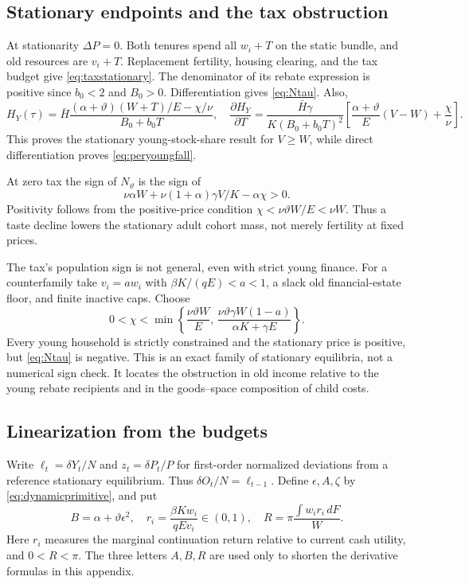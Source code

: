 \documentclass[11pt]{article}
\newcommand{\dd}{\,d}
\newcommand{\HH}{\bar H}
\newcommand{\tht}{\vartheta}
\begin{document}
\subsection{Stationary endpoints and the tax obstruction}
At stationarity $\Delta P=0$. Both tenures spend all $w_i+T$ on the static bundle, and old resources are $v_i+T$. Replacement fertility, housing clearing, and the tax budget give \eqref{eq:taxstationary}. The denominator of its rebate expression is positive since $b_0<2$ and $B_0>0$. Differentiation gives \eqref{eq:Ntau}. Also,
\begin{equation}
 H_Y(\tau)=\HH\frac{(\alpha+\tht)(W+T)/E-\chi/\nu}{B_0+b_0T},\quad
 \frac{\partial H_Y}{\partial T}
 =\frac{\HH\gamma}{K(B_0+b_0T)^2}
 \left[\frac{\alpha+\tht}{E}(V-W)+\frac\chi\nu\right].\label{eq:HYtax}
\end{equation}
This proves the stationary young-stock-share result for $V\ge W$, while direct differentiation proves \eqref{eq:peryoungfall}.

At zero tax the sign of $N_{\tht}$ is the sign of
\[
 \nu\alpha W+\nu(1+\alpha)\gamma V/K-\alpha\chi>0.
\]
Positivity follows from the positive-price condition $\chi<\nu\tht W/E<\nu W$. Thus a taste decline lowers the stationary adult cohort mass, not merely fertility at fixed prices.

The tax's population sign is not general, even with strict young finance. For a counterfamily take $v_i=aw_i$ with
$\beta K/(qE)<a<1$, a slack old financial-estate floor, and finite inactive caps. Choose
\begin{equation}
 0<\chi<\min\left\{
 \frac{\nu\tht W}{E},\,
 \frac{\nu\tht\gamma W(1-a)}{\alpha K+\gamma E}
 \right\}.\label{eq:taxcounter}
\end{equation}
Every young household is strictly constrained and the stationary price is positive, but \eqref{eq:Ntau} is negative. This is an exact family of stationary equilibria, not a numerical sign check. It locates the obstruction in old income relative to the young rebate recipients and in the goods--space composition of child costs.

\subsection{Linearization from the budgets}
Write $\ell_t=\delta Y_t/N$ and $z_t=\delta P_t/P$ for first-order normalized deviations from a reference stationary equilibrium. Thus $\delta O_t/N=\ell_{t-1}$. Define $\epsilon,A,\zeta$ by \eqref{eq:dynamicprimitive}, and put
\begin{equation}
 B=\alpha+\tht\epsilon^2,\quad
 r_i=\frac{\beta K w_i}{qEv_i}\in(0,1),\quad
 R=\pi\frac{\int w_ir_i\dd F}{W}.\label{eq:Rdynamic}
\end{equation}
Here $r_i$ measures the marginal continuation return relative to current cash utility, and $0<R<\pi$. The three letters $A,B,R$ are used only to shorten the derivative formulas in this appendix.
\end{document}
